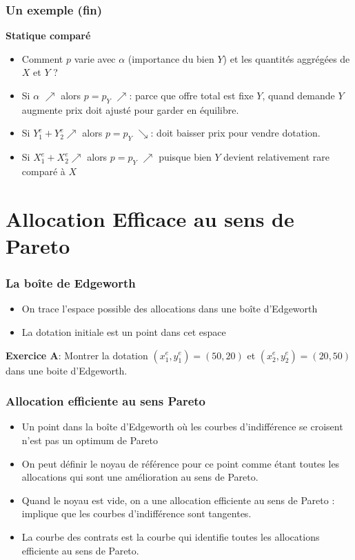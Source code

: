\documentclass[handout]{beamer}
\newenvironment{iPar}[1]{\textbf{#1} \begin{itemize}}{\end{itemize}}
\begin{document}
\begin{frame}\frametitle{Un exemple (fin)}

\begin{iPar}{Statique comparé} \item Comment $p$ varie avec $\alpha$
(importance du bien $Y$) et les quantités aggrégées de $X$ et $Y$ ?
\pause \item Si $\alpha$ $\nearrow$ alors $p=p_Y$ $\nearrow$: parce que offre total est fixe $Y$, quand demande $Y$ augmente prix doit ajusté pour garder en équilibre. \pause \item Si $Y_1^e + Y_2^e
\nearrow$ alors $p=p_Y$ $\searrow$: doit baisser prix pour vendre dotation. 
\pause \item Si $X_1^e + X_2^e \nearrow$ alors $p = p_Y$ $\nearrow$ puisque
bien $Y$ devient relativement rare comparé à $X$\end{iPar}

\end{frame}

\section{Allocation Efficace au sens de Pareto}

\begin{frame}\frametitle{La boîte de Edgeworth} 

\begin{itemize}
    \item On trace l'espace possible des allocations dans une boîte d'Edgeworth
    \item La dotation initiale est un point dans cet espace
\end{itemize}
 
\textbf{Exercice A}: Montrer la dotation $(x^e_1,y_1^e) = (50,20)$ et $(x^e_2,y_2^e)=(20,50)$ dans une boite d'Edgeworth.
\end{frame}


\begin{frame}\frametitle{Allocation efficiente au sens Pareto}
\begin{itemize}
    \item Un point dans la boîte d'Edgeworth où les courbes d'indifférence se croisent n'est pas un optimum de Pareto 
    \item On peut définir le noyau de référence pour ce point comme étant toutes les allocations qui sont une amélioration au sens de Pareto. 
    \item Quand le noyau est vide, on a une allocation efficiente au sens de Pareto : implique que les courbes d'indifférence sont tangentes.
    \item La courbe des contrats est la courbe qui identifie toutes les allocations efficiente au sens de Pareto. 
\end{itemize}

\end{frame}
\end{document}
